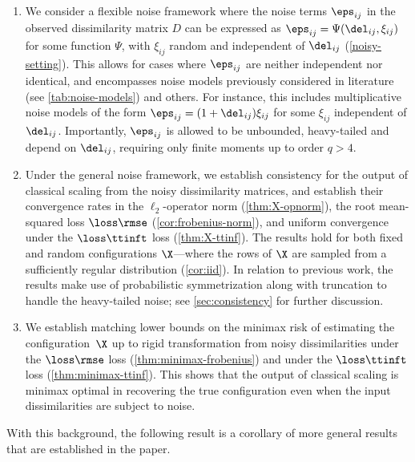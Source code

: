 \documentclass[10pt]{article}
\begin{document}
\begin{enumerate}[label=(\roman*)]
    \item We consider a flexible noise framework where the noise terms $\eps_{ij}$ in the observed dissimilarity matrix $D$ can be expressed as $\eps_{ij} = \Psi(\del_{ij}, \xi_{ij})$ for some function $\Psi$, with $\xi_{ij}$ random and independent of $\del_{ij}$ (\cref{noisy-setting}). This allows for cases where $\eps_{ij}$ are neither independent nor identical, and encompasses noise models previously considered in literature (see \cref{tab:noise-models}) and others. For instance, this includes multiplicative noise models of the form $\eps_{ij} = (1+\del_{ij}) \xi_{ij}$ for some $\xi_{ij}$ independent of $\del_{ij}$. Importantly, $\eps_{ij}$ is allowed to be unbounded, heavy-tailed and depend on $\del_{ij}$, requiring only finite moments up to order $q > 4$.
    \item Under the general noise framework, we establish consistency for the output of classical scaling from the noisy dissimilarity matrices, and establish their convergence rates in the $\ell_2$-operator norm (\cref{thm:X-opnorm}), the root mean-squared loss $\loss\rmse$ (\cref{cor:frobenius-norm}), and uniform convergence under the $\loss\ttinft$ loss (\cref{thm:X-ttinf}). The results hold for both fixed and random configurations $\X$---where the rows of $\X$ are sampled \iid{} from a sufficiently regular distribution (\cref{cor:iid}). In relation to previous work, the results make use of probabilistic symmetrization along with truncation to handle the heavy-tailed noise; see \cref{sec:consistency} for further discussion.
    \item We establish matching lower bounds on the minimax risk of estimating the configuration~$\X$ up to rigid transformation from noisy dissimilarities under the $\loss\rmse$ loss (\cref{thm:minimax-frobenius}) and under the $\loss\ttinft$ loss (\cref{thm:minimax-ttinf}). This shows that the output of classical scaling is minimax optimal in recovering the true configuration even when the input dissimilarities are subject to noise.
\end{enumerate}

\noindent With this background, the following result is a corollary
of more general results that are established in the paper. 
\end{document}
